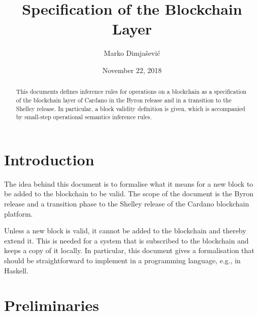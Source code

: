 \documentclass[11pt,a4paper]{article}
\begin{document}
\title{Specification of the Blockchain Layer}

\author{Marko Dimjašević}

\date{November 22, 2018}

\maketitle

\begin{abstract}
  This documents defines inference rules for operations on a blockchain as a
  specification of the blockchain layer of Cardano in the Byron release and in
  a transition to the Shelley release.
  In particular, a block validity definition is given, which is accompanied by
  small-step operational semantics inference rules.
\end{abstract}

\tableofcontents
\listoffigures

\section{Introduction}
\label{sec:introduction}

The idea behind this document is to formalise what it means for a new block to
be added to the blockchain to be valid.
%
The scope of the document is the Byron release and a transition phase to the
Shelley release of the Cardano blockchain platform.


Unless a new block is valid, it cannot be added to the blockchain and thereby
extend it.
%
This is needed for a system that is subscribed to the blockchain and keeps a
copy of it locally.
%
In particular, this document gives a formalisation that should be
straightforward to implement in a programming language, e.g., in Haskell.


\section{Preliminaries}
\label{sec:preliminaries}
\end{document}
